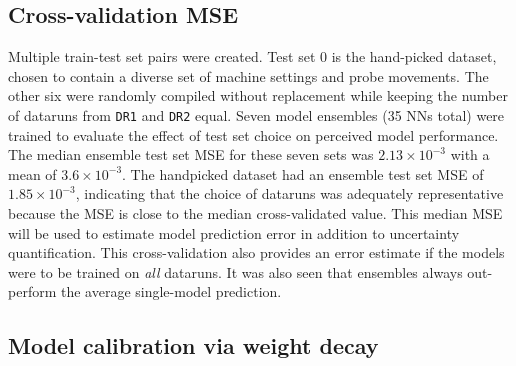 \subsection{Cross-validation MSE}

Multiple train-test set pairs were created. Test set 0 is the hand-picked dataset, chosen to contain a diverse set of machine settings and probe movements. The other six were randomly compiled without replacement while keeping the number of dataruns from \texttt{DR1} and \texttt{DR2} equal. Seven model ensembles (35 NNs total) were trained to evaluate the effect of test set choice on perceived model performance. The median ensemble test set MSE for these seven sets was $2.13 \times 10^{-3}$ with a mean of $3.6 \times 10^{-3}$. The handpicked dataset had an ensemble test set MSE of $1.85 \times 10^{-3}$, indicating that the choice of dataruns was adequately representative because the MSE is close to the median cross-validated value. This median MSE will be used to estimate model prediction error in addition to uncertainty quantification. This cross-validation also provides an error estimate if the models were to be trained on \emph{all} dataruns. It was also seen that ensembles always out-perform the average single-model prediction.



\subsection{Model calibration via weight decay}

